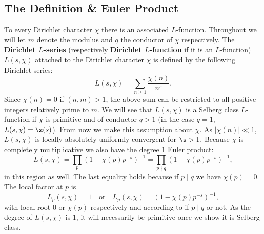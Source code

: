     \subsection*{The Definition \& Euler Product}
      To every Dirichlet character $\chi$ there is an associated $L$-function. Throughout we will let $m$ denote the modulus and $q$ the conductor of $\chi$ respectively. The \textbf{Dirichlet $L$-series} (respectively \textbf{Dirichlet $L$-function} if it is an $L$-function) $L(s,\chi)$ attached to the Dirichlet character $\chi$ is defined by the following Dirichlet series:
      \[
        L(s,\chi) = \sum_{n \ge 1}\frac{\chi(n)}{n^{s}}.
      \]
      Since $\chi(n) = 0$ if $(n,m) > 1$, the above sum can be restricted to all positive integers relatively prime to $m$. We will see that $L(s,\chi)$ is a Selberg class $L$-function if $\chi$ is primitive and of conductor $q > 1$ (in the case $q = 1$, $L(s,\chi) = \z(s)$). From now we make this assumption about $\chi$. As $|\chi(n)| \ll 1$, $L(s,\chi)$ is locally absolutely uniformly convergent for $\s > 1$. Because $\chi$ is completely multiplicative we also have the degree $1$ Euler product:
      \[
        L(s,\chi) = \prod_{p}(1-\chi(p)p^{-s})^{-1} = \prod_{p \nmid q}(1-\chi(p)p^{-s})^{-1},
      \]
      in this region as well. The last equality holds because if $p \mid q$ we have $\chi(p) = 0$. The local factor at $p$ is
      \[
        L_{p}(s,\chi) = 1 \quad \text{or} \quad L_{p}(s,\chi) = (1-\chi(p)p^{-s})^{-1},
      \]
      with local root $0$ or $\chi(p)$ respectively and according to if $p \mid q$ or not. As the degree of $L(s,\chi)$ is $1$, it will necessarily be primitive once we show it is Selberg class.

